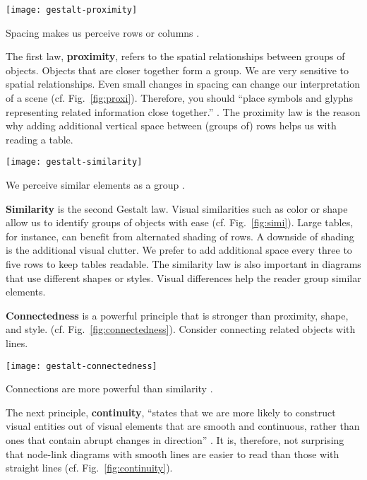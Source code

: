 \begin{marginfigure}
\centering
\texttt{[image: gestalt-proximity]}
\caption{\label{fig:proxi} Spacing makes us perceive rows or columns \cite{Ware12}.}%
\end{marginfigure}


The first law, \textbf{proximity}, refers to the spatial relationships between groups of objects. Objects that are closer together form a group. We are very sensitive to spatial relationships. Even small changes in spacing can change our interpretation of a scene (cf. Fig.~\ref{fig:proxi}). Therefore, you should ``place symbols and glyphs representing related information close together.'' 
\cite{Ware12}. The proximity law is the reason why adding additional vertical space between (groups of) rows helps us with reading a table.

\begin{marginfigure}
\centering
\texttt{[image: gestalt-similarity]}
\caption{\label{fig:simi} We perceive similar elements as a group \cite{Ware12}.}%
\end{marginfigure}

\textbf{Similarity} is the second Gestalt law. Visual similarities such as color or shape allow us to identify groups of objects with ease (cf. Fig.~\ref{fig:simi}). Large tables, for instance, can benefit from alternated shading of rows. A downside of shading is the additional visual clutter. We prefer to add additional space every three to five rows to keep tables readable. The similarity law is also important in diagrams that use different shapes or styles. Visual differences help the reader group similar elements.


\textbf{Connectedness} is a powerful principle that is stronger than proximity, shape, and style.  (cf. Fig.~\ref{fig:connectedness}). Consider connecting related objects with lines.
\begin{marginfigure}
\centering
\texttt{[image: gestalt-connectedness]}
\caption{\label{fig:connectedness} Connections are more powerful than similarity \cite{Ware12}.}%
\end{marginfigure}

The next principle, \textbf{continuity}, ``states that we are more likely to construct visual entities out of visual elements that are smooth and continuous, rather than ones that contain abrupt changes in direction'' \cite{Ware12}. It is, therefore, not surprising that node-link diagrams with smooth lines are easier to read than those with straight lines (cf. Fig.~\ref{fig:continuity}).

